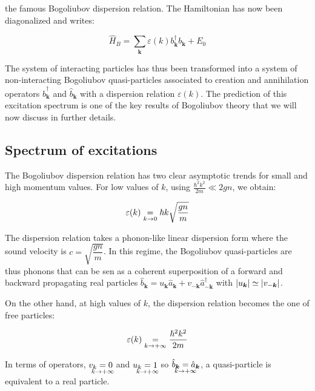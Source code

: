 the famous Bogoliubov dispersion relation. The Hamiltonian has now been diagonalized and writes:

\begin{equation}
    \hat{H}_B = \sum_{\bm{k}}\varepsilon(k) b^{\dagger}_{\bm{k}}  b_{\bm{k}}+E_0
\end{equation}

The system of interacting particles has thus been transformed into a system of non-interacting Bogoliubov quasi-particles associated to creation and annihilation operators $\hat{b}^{\dagger}_{\bm{k}}$ and $\hat{b}_{\bm{k}}$ with a dispersion relation $\varepsilon(k)$. The prediction of this excitation spectrum is one of the key results of Bogoliubov theory that we will now discuss in further details.

\subsection{Spectrum of excitations}
\label{sec:spectrum}

The Bogoliubov dispersion relation has two clear asymptotic trends for small and high momentum values. For low values of $k$, using $\frac{\hbar^2 k^2}{2m} \ll 2gn$, we obtain:

\begin{equation}
    \varepsilon(k) \underrel{k \to 0}{=} \hbar k \sqrt{\frac{gn}{m}}
\end{equation}

The dispersion relation takes a phonon-like linear dispersion form where the sound velocity is $c=\sqrt{\dfrac{gn}{m}}$. In this regime, the Bogoliubov quasi-particles are thus phonons that can be sen as a coherent superposition of a forward and backward propagating real particles $\hat{b}_{\bm{k}}=u_{\bm{k}} \hat{a}_{\bm{k}} + v_{-\bm{k}} \hat{a}^{\dagger}_{-\bm{k}}$ with $\left\lvert u_{\bm{k}}\right\rvert \simeq \left\lvert v_{-\bm{k}}\right\rvert$.

On the other hand, at high values of $k$, the dispersion relation becomes the one of free particles:

\begin{equation}
    \varepsilon(k) \underrel{k \to +\infty}{=} \frac{\hbar^2 k^2}{2m}
\end{equation}

In terms of operators, $v_k \underrel[c]{k \to +\infty}{=} 0$ and $u_k \underrel[c]{k \to +\infty}{=} 1$ so $\hat{b}_{\bm{k}}\underrel[c]{k \to +\infty}{=}\hat{a}_{\bm{k}}$, a quasi-particle is equivalent to a real particle. 

